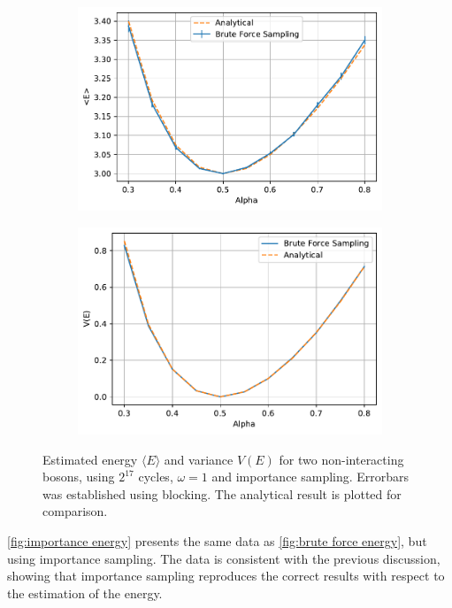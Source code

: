 \begin{figure}
	\begin{subfigure}{\textwidth}
		\centering
		\includegraphics[width=.8\linewidth]{figures/energy_bruteforce1.pdf}
	\end{subfigure}%
	\begin{subfigure}{\textwidth}
		\centering
		\includegraphics[width=.8\linewidth]{figures/variance_bruteforce1.pdf}
	\end{subfigure}%
	\centering
	\caption{Estimated energy $\langle E \rangle$ and variance $V(E)$ for two non-interacting bosons, using $2^{17}$ cycles, $\omega = 1$ and importance sampling. Errorbars was established using blocking. The analytical result is plotted for comparison. }
	\label{fig:importance energy}
\end{figure}

\autoref{fig:importance energy} presents the same data as \autoref{fig:brute force energy}, but using importance sampling. The data is consistent with the previous discussion, showing that importance sampling reproduces the correct results with respect to the estimation of the energy.

